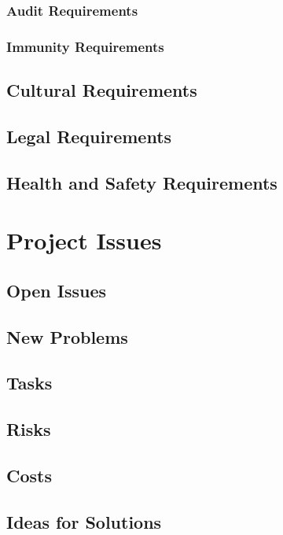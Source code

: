 \documentclass[12pt, titlepage]{article}
\begin{document}
\subsubsection{Audit Requirements}


\subsubsection{Immunity Requirements}



\subsection{Cultural Requirements}


\subsection{Legal Requirements}



\subsection{Health and Safety Requirements}




\section{Project Issues}

\subsection{Open Issues}



\subsection{New Problems}


\subsection{Tasks}



\subsection{Risks}



\subsection{Costs}



\subsection{Ideas for Solutions}
\end{document}

